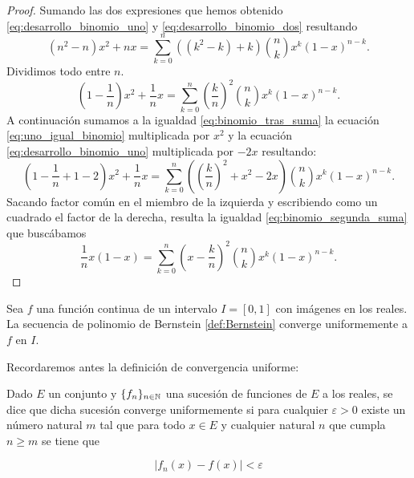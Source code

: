 \begin{proof}
Sumando las dos expresiones que hemos obtenido
 \eqref{eq:desarrollo_binomio_uno} y \eqref{eq:desarrollo_binomio_dos}
 resultando 
 \begin{equation} 
    (n^2 - n)  x^2 + nx= \sum_{k=0}^{n} ((k^2 - k)+k) \binom{n}{k} x^{k} (1-x)^{n-k}.
  \end{equation}
  Dividimos todo entre $n$. 
  \begin{equation} \label{eq:binomio_tras_suma}
    (1 - \frac{1}{n})  x^2 + \frac{1}{n}x= \sum_{k=0}^{n} \left( \frac{k}{n} \right)^2 \binom{n}{k} x^{k} (1-x)^{n-k}.
  \end{equation}
  A continuación sumamos a la igualdad \eqref{eq:binomio_tras_suma} la ecuación \eqref{eq:uno_igual_binomio} multiplicada por $x^2$ y la ecuación \eqref{eq:desarrollo_binomio_uno}
  multiplicada por $-2x$ resultando: 
  \begin{equation} 
    \left(1 - \frac{1}{n} + 1 -2 \right)  x^2 + \frac{1}{n}x= \sum_{k=0}^{n} \left( \left( \frac{k}{n} \right)^2 + x^2 -2x \right) \binom{n}{k} x^{k} (1-x)^{n-k}.
  \end{equation}
  Sacando factor común en el miembro de la izquierda y escribiendo como un cuadrado el factor de la derecha,  resulta la igualdad \ref{eq:binomio_segunda_suma} que buscábamos
  \begin{equation} 
     \frac{1}{n} x (1-x)= \sum_{k=0}^{n}  \left( x-\frac{k}{n} \right)^2  \binom{n}{k} x^{k} (1-x)^{n-k}.
  \end{equation}

    
\end{proof}

\begin{teorema}\label{teo:aproximacion_bernstein}

    Sea $f$ una función continua de un intervalo $I = [0,1]$ con imágenes en los reales. 
    La secuencia de polinomio de Bernstein
    \ref{def:Bernstein} converge uniformemente a $f$ en $I.$
    
\end{teorema}
Recordaremos antes la definición de convergencia uniforme: 

\begin{definicion}

    Dado $E$ un conjunto y $\{f_n\}_{n \in \mathbb{N}}$ una sucesión de funciones de $E$
    a los reales, se dice 
    que dicha sucesión converge uniformemente si para cualquier $\varepsilon > 0$ existe un número natural $m$ tal que 
    para todo $x   \in E$ y cualquier natural $n$ que cumpla $n \geq m$ se tiene que 

    \begin{equation*}
        |f_n(x) - f(x) | < \varepsilon
    \end{equation*}
    
\end{definicion}

